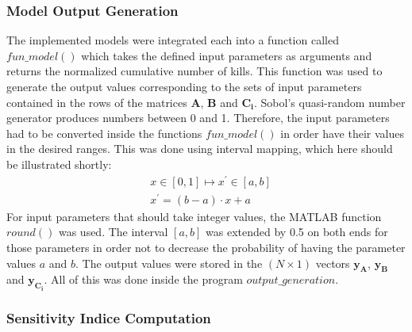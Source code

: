 \documentclass[11pt]{article}
\begin{document}
\subsubsection{Model Output Generation}
The implemented models were integrated each into a function called $fun\_model()$ which takes the defined input parameters as arguments and returns the normalized cumulative number of kills. This function was used to generate the output values corresponding to the sets of input parameters contained in the rows of the matrices $\boldsymbol{A}$, $\boldsymbol{B}$ and $\boldsymbol{C_i}$. Sobol's quasi-random number generator produces numbers between 0 and 1. Therefore, the input parameters had to be converted inside the functions $fun\_model()$ in order have their values in the desired ranges. This was done using interval mapping, which here should be illustrated shortly:
\begin{align*}
& x \in [0,1] \longmapsto x^\prime \in [a,b]\\
&x^\prime = (b-a) \cdot x + a
\end{align*}
For input parameters that should take integer values, the MATLAB function $round()$ was used. The interval $[a,b]$ was extended by 0.5 on both ends for those parameters in order not to decrease the probability of having the parameter values $a$ and $b$. The output values were stored in the $(N \times 1)$ vectors $\boldsymbol{y_A}$, $\boldsymbol{y_B}$ and $\boldsymbol{y_{C_i}}$. All of this was done inside the program $output\_generation$.

\subsubsection{Sensitivity Indice Computation}
\end{document}
